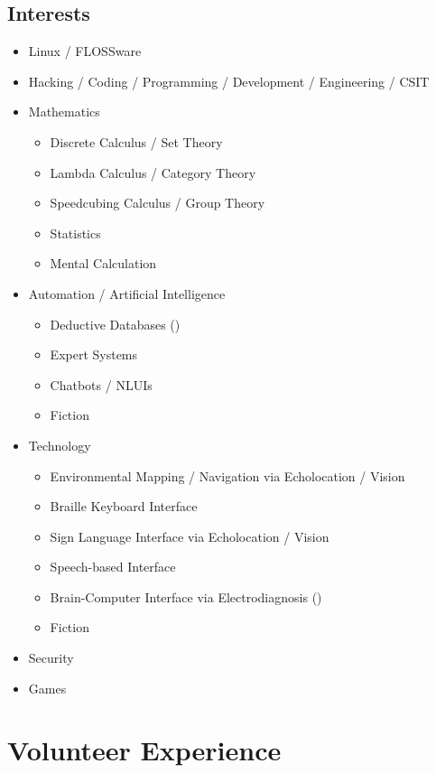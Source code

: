\documentclass[12pt,a4paper,oneside]{article}
\newcommand{\sh}[1]{{\color{gray}{#1}}}
\begin{document}
\subsection{Interests}
\begin{itemize}
	\setlength\itemsep{0em}
	\item Linux / FLOSSware
	\item Hacking / Coding / Programming / Development / Engineering / CSIT
	\item Mathematics
	\begin{itemize}
		\setlength\itemsep{0em}
		\item Discrete Calculus / Set Theory
		\item Lambda Calculus / Category Theory
		\item Speedcubing Calculus / Group Theory
		\item Statistics
		\item Mental Calculation
	\end{itemize}
	\item Automation / Artificial Intelligence
	\begin{itemize}
		\setlength\itemsep{0em}
		\item Deductive Databases (\sh{Datalog / Dedalus})
		\item Expert Systems
		\item Chatbots / NLUIs
		\item Fiction
	\end{itemize}
	\item Technology
	\begin{itemize}
		\setlength\itemsep{0em}
		\item Environmental Mapping / Navigation via Echolocation / Vision
		\item Braille Keyboard Interface
		\item Sign Language Interface via Echolocation / Vision
		\item Speech-based Interface
		\item Brain-Computer Interface via Electrodiagnosis (\sh{EG NeuroSky})
		\item Fiction
	\end{itemize}
	\item Security
	\item Games
\end{itemize}

\newpage
\section{Volunteer Experience}
\end{document}
